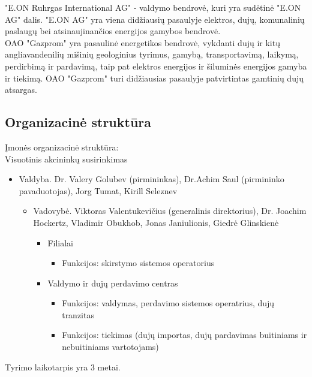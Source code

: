 \documentclass[11pt,a4paper]{article}
\begin{document}
"E.ON Ruhrgas International AG" - valdymo bendrovė, kuri yra sudėtinė "E.ON AG" dalis. "E.ON AG" yra viena didžiausių
pasaulyje elektros, dujų, komunalinių paslaugų bei atsinaujinančios energijos gamybos bendrovė.\\

OAO "Gazprom" yra pasaulinė energetikos bendrovė, vykdanti dujų ir kitų angliavandenilių mišinių geologinius
tyrimus, gamybą, transportavimą, laikymą, perdirbimą ir pardavimą, taip pat elektros energijos ir šiluminės
energijos gamyba ir tiekimą. OAO "Gazprom" turi didžiausias pasaulyje patvirtintas gamtinių dujų atsargas.\\

\subsection{Organizacinė struktūra}

Įmonės organizacinė struktūra:\\

Visuotinis akcininkų susirinkimas
\begin{itemize}
	\item Valdyba. Dr. Valery Golubev (pirmininkas), Dr.Achim Saul (pirmininko pavaduotojas), Jorg Tumat, Kirill Seleznev
	\begin{itemize}
		\item Vadovybė. Viktoras Valentukevičius (generalinis direktorius), Dr. Joachim Hockertz, Vladimir Obukhob, Jonas Janiulionis, Giedrė Glinskienė
		\begin{itemize}
			\item Filialai
			\begin{itemize}
				\item Funkcijos: skirstymo sistemos operatorius
			\end{itemize}
			\item Valdymo ir dujų perdavimo centras
			\begin{itemize}
				\item Funkcijos: valdymas, perdavimo sistemos operatrius, dujų tranzitas
				\item Funkcijos: tiekimas (dujų importas, dujų pardavimas buitiniams ir nebuitiniams vartotojams)
			\end{itemize}
		\end{itemize}
	\end{itemize}
\end{itemize}

Tyrimo laikotarpis yra 3 metai.
\end{document}
